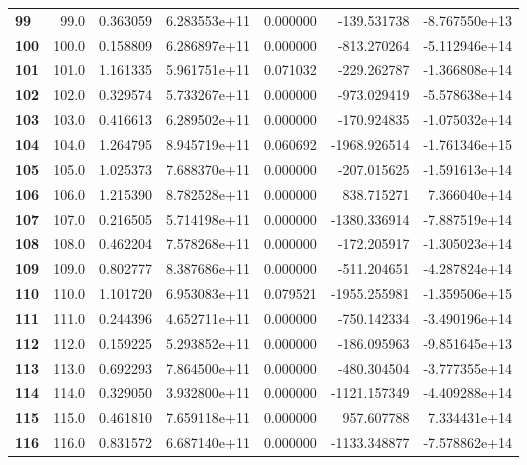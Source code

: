\documentclass{report}[12pt]
\begin{document}
\begin{center}
\begin{tabular}{lrrrrrr}
\textbf{99  } &           99.0 &   0.363059 &  6.283553e+11 &    0.000000 &  -139.531738 & -8.767550e+13 \\
\textbf{100 } &          100.0 &   0.158809 &  6.286897e+11 &    0.000000 &  -813.270264 & -5.112946e+14 \\
\textbf{101 } &          101.0 &   1.161335 &  5.961751e+11 &    0.071032 &  -229.262787 & -1.366808e+14 \\
\textbf{102 } &          102.0 &   0.329574 &  5.733267e+11 &    0.000000 &  -973.029419 & -5.578638e+14 \\
\textbf{103 } &          103.0 &   0.416613 &  6.289502e+11 &    0.000000 &  -170.924835 & -1.075032e+14 \\
\textbf{104 } &          104.0 &   1.264795 &  8.945719e+11 &    0.060692 & -1968.926514 & -1.761346e+15 \\
\textbf{105 } &          105.0 &   1.025373 &  7.688370e+11 &    0.000000 &  -207.015625 & -1.591613e+14 \\
\textbf{106 } &          106.0 &   1.215390 &  8.782528e+11 &    0.000000 &   838.715271 &  7.366040e+14 \\
\textbf{107 } &          107.0 &   0.216505 &  5.714198e+11 &    0.000000 & -1380.336914 & -7.887519e+14 \\
\textbf{108 } &          108.0 &   0.462204 &  7.578268e+11 &    0.000000 &  -172.205917 & -1.305023e+14 \\
\textbf{109 } &          109.0 &   0.802777 &  8.387686e+11 &    0.000000 &  -511.204651 & -4.287824e+14 \\
\textbf{110 } &          110.0 &   1.101720 &  6.953083e+11 &    0.079521 & -1955.255981 & -1.359506e+15 \\
\textbf{111 } &          111.0 &   0.244396 &  4.652711e+11 &    0.000000 &  -750.142334 & -3.490196e+14 \\
\textbf{112 } &          112.0 &   0.159225 &  5.293852e+11 &    0.000000 &  -186.095963 & -9.851645e+13 \\
\textbf{113 } &          113.0 &   0.692293 &  7.864500e+11 &    0.000000 &  -480.304504 & -3.777355e+14 \\
\textbf{114 } &          114.0 &   0.329050 &  3.932800e+11 &    0.000000 & -1121.157349 & -4.409288e+14 \\
\textbf{115 } &          115.0 &   0.461810 &  7.659118e+11 &    0.000000 &   957.607788 &  7.334431e+14 \\
\textbf{116 } &          116.0 &   0.831572 &  6.687140e+11 &    0.000000 & -1133.348877 & -7.578862e+14 \\

\end{tabular}
\end{center}
\end{document}
